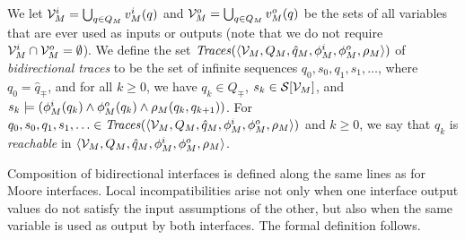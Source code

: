 \noindent 
We let 
${\cal V}^i_M = \bigcup_{q \in Q_M} v^i_M(q)$ and 
${\cal V}^o_M = \bigcup_{q \in Q_M} v^o_M(q)$
be the sets of all variables that are ever used as inputs or outputs
(note that we do not require ${\cal V}^i_M \cap {\cal V}^o_M = \emptyset$). 
We define the set
${\text{\textit{Traces}}}(\langle {\cal V}_M,Q_M,\hat{q}_M,\phi^i_M,\phi^o_M,\rho_M \rangle)$ 
of {\em bidirectional traces\/} to be the set of infinite sequences 
$q_0, s_0, q_1, s_1, \ldots$, where $q_0 = \hat{q}_\mp$, 
and for all $k \geq 0$, we have 
$q_k \in Q_\mp$,  $s_k \in {\cal S}[{\cal V}_M]$, and 
$s_k \models (\phi^i_M(q_k) \wedge \phi^o_M(q_k) \wedge \rho_M(q_k,q_{k+1}))$.
For $q_0, s_0, q_1, s_1, \ldots \in
{\text{\textit{Traces}}}(\langle {\cal V}_M,Q_M,\hat{q}_M,\phi^i_M,\phi^o_M,\rho_M \rangle)$
and $k \geq 0$, we say that $q_k$ is {\em reachable\/} in 
$\langle {\cal V}_M,Q_M,\hat{q}_M,\phi^i_M,\phi^o_M,\rho_M \rangle$. 

\noindent
Composition of bidirectional interfaces is defined along the
same lines as for Moore interfaces. %
Local 
incompatibilities arise not only when one interface output values 
do not satisfy the input assumptions of the other, but also when 
the same variable is used as output by both interfaces. The formal 
definition follows.

